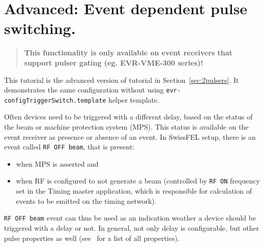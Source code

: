\documentclass[12pt,a4paper]{article}
\begin{document}
\section{Advanced: Event dependent pulse switching.}\label{sec:triggerSwitching}
\begin{quote}
\textbf{This functionality is only available on event receivers that support pulser gating (eg. EVR-VME-300 series)!}
\end{quote}

This tutorial is the advanced version of tutorial in Section~\ref{sec:2pulsers}. It demonstrates the same configuration without using \texttt{evr-configTriggerSwitch.template} helper template.

Often devices need to be triggered with a different delay, based on the status of the beam or machine protection system (MPS). This status is available on the event receiver as presence or absence of an event. In SwissFEL setup, there is an event called \texttt{RF OFF beam}, that is present:
\begin{itemize}
\item when MPS is asserted and
\item when RF is configured to not generate a beam (controlled by \texttt{RF ON} frequency set in the Timing master application, which is responsible for calculation of events to be emitted on the timing network).
\end{itemize}
\texttt{RF OFF beam} event can thus be used as an indication weather a device should be triggered with a delay or not. In general, not only delay is configurable, but other pulse properties as well (see~\cite{evr_manual} for a list of all properties). 
\end{document}
